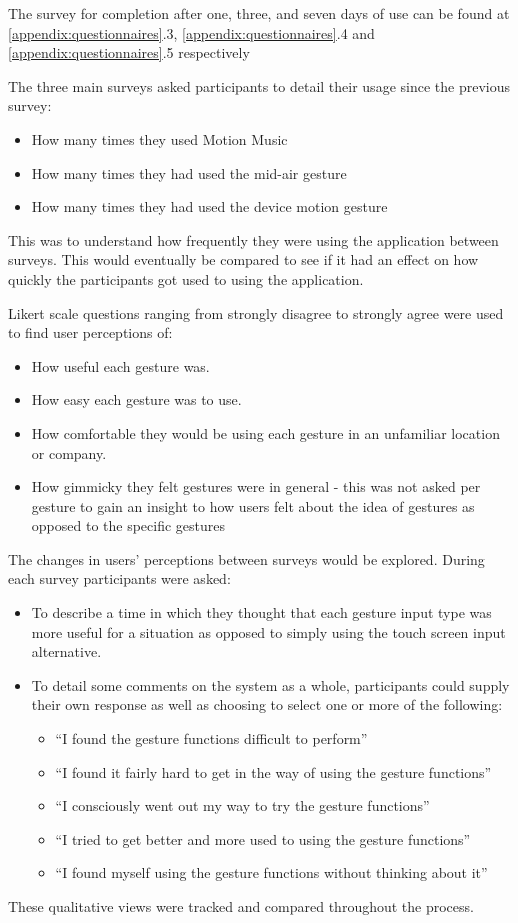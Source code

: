 \documentclass{l4proj}
\begin{document}
The survey for completion after one, three, and seven days of use can be found at \autoref{appendix:questionnaires}.3, \ref{appendix:questionnaires}.4 and \ref{appendix:questionnaires}.5 respectively

The three main surveys asked participants to detail their usage since the previous survey:
\begin{itemize}
    \item How many times they used Motion Music
    \item How many times they had used the mid-air gesture
    \item How many times they had used the device motion gesture
\end{itemize}

 This was to understand how frequently they were using the application between surveys. This would eventually be compared to see if it had an effect on how quickly the participants got used to using the application. 
 
 Likert scale questions ranging from strongly disagree to strongly agree were used to find user perceptions of:
 \begin{itemize}
    \item How useful each gesture was.
    \item How  easy each gesture was to use.
    \item How comfortable they would be using each gesture in an unfamiliar location or company.
    \item How gimmicky they felt gestures were in general - this was not asked per gesture to gain an insight to how users felt about the idea of gestures as opposed to the specific gestures
\end{itemize}

 The changes in users' perceptions between surveys would be explored. During each survey participants were asked: 
 \begin{itemize}
     \item To describe a time in which they thought that each gesture input type was more useful for a situation as opposed to simply using the touch screen input alternative.
     \item To detail some comments on the system as a whole, participants could supply their own response as well  as choosing to select one or more of the following: \begin{itemize}
         \item ``I found the gesture functions difficult to perform''
         \item ``I found it fairly hard to get in the way of using the gesture functions''
         \item ``I consciously went out my way to try the gesture functions''
         \item ``I tried to get better and more used to using the gesture functions''
         \item ``I found myself using the gesture functions without thinking about it''
     \end{itemize}
 \end{itemize}
These qualitative views were tracked and compared throughout the process.
\end{document}
